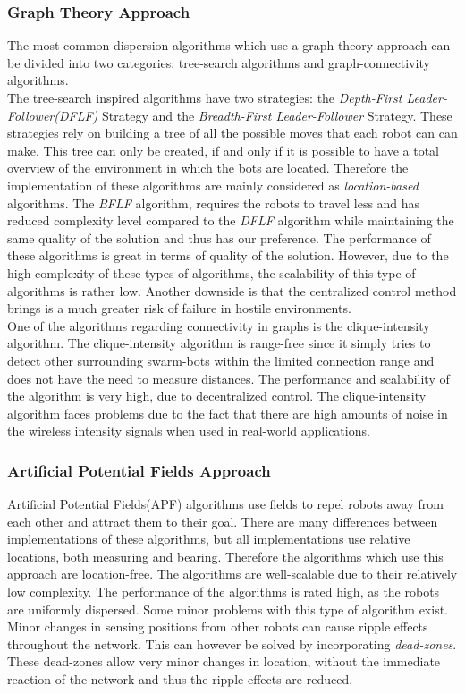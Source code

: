 \subsubsection{Graph Theory Approach}
The most-common dispersion algorithms which use a graph theory approach can be divided into two categories: tree-search algorithms and graph-connectivity algorithms.\\
The tree-search inspired algorithms have two strategies: the \emph{Depth-First Leader-Follower(DFLF)} Strategy and the \emph{Breadth-First Leader-Follower} Strategy.\cite{hsiang2004algorithms} These strategies rely on building a tree of all the possible moves that each robot can can make. 
This tree can only be created, if and only if it is possible to have a total overview of the environment in which the bots are located. Therefore the implementation of these algorithms are mainly considered as \emph{location-based} algorithms.
The \emph{BFLF} algorithm, requires the robots to travel less and has reduced complexity level compared to the \emph{DFLF} algorithm while maintaining the same quality of the solution and thus has our preference.
The performance of these algorithms is great in terms of quality of the solution.
However, due to the high complexity of these types of algorithms, the scalability of this type of algorithms is rather low.
Another downside is that the centralized control method brings is a much greater risk of failure in hostile environments.\\
One of the algorithms regarding connectivity in graphs is the clique-intensity algorithm.\cite{ugur2007dispersion}
The clique-intensity algorithm is range-free since it simply tries to detect other surrounding swarm-bots within the limited connection range and does not have the need to measure distances. The performance and scalability of the algorithm is very high, due to decentralized control.
The clique-intensity algorithm faces problems due to the fact that there are high amounts of noise in the wireless intensity signals when used in real-world applications. 

\subsubsection{Artificial Potential Fields Approach}
Artificial Potential Fields(APF) algorithms use fields to repel robots away from each other and attract them to their goal.\cite{khatib1986real}
There are many differences between implementations of these algorithms, but all implementations use relative locations, both measuring and bearing. Therefore the algorithms which use this approach are location-free.\cite{pakanati2010swarm}
The algorithms are well-scalable due to their relatively low complexity.
The performance of the algorithms is rated high, as the robots are uniformly dispersed.
Some minor problems with this type of algorithm exist.
Minor changes in sensing positions from other robots can cause ripple effects throughout the network.
This can however be solved by incorporating \emph{dead-zones}.
These dead-zones allow very minor changes in location, without the immediate reaction of the network and thus the ripple effects are reduced.\cite{pakanati2010swarm}


